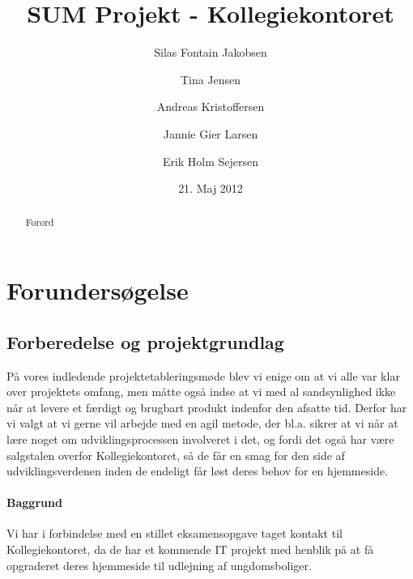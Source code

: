 \documentclass[12pt, a4paper]{report}
\begin{document}
\usepackage[utf8]{inputenc}
\usepackage[T1]{fontenc}
\usepackage[danish]{babel}

\usepackage{setspace}
\onehalfspacing
\usepackage{fix-cm}
\usepackage[a4paper,margin=2.5cm,headheight=2cm]{geometry}
\usepackage{lastpage}
\usepackage{fancyhdr}
\pagestyle{fancy} %
\fancyhead[R]{\today}


\setcounter{secnumdepth}{-1}
\title{SUM Projekt - Kollegiekontoret}
\author{Silas Fontain Jakobsen \and Tina Jensen \and Andreas Kristoffersen \and Jannie Gier Larsen \and Erik Holm Sejersen}
\date{21. Maj 2012}


\begin{titlepage}
\maketitle
\end{titlepage}

\begin{abstract}
Forord
\end{abstract}

\tableofcontents

\chapter{Forundersøgelse}

\section{Forberedelse og projektgrundlag}
På vores indledende projektetableringsmøde blev vi enige om at vi alle var klar over projektets omfang, men måtte også indse at vi med al sandsynlighed ikke når at levere et færdigt og brugbart produkt indenfor den afsatte tid.
Derfor har vi valgt at vi gerne vil arbejde med en agil metode, der bl.a. sikrer at vi når at lære noget om udviklingsprocessen involveret i det, og fordi det også har være salgstalen overfor Kollegiekontoret, så de får en smag for den side af udviklingsverdenen inden de endeligt får løst deres behov for en hjemmeside.

\subsubsection{Baggrund}
Vi har i forbindelse med en stillet eksamensopgave taget kontakt til Kollegiekontoret, da de har et kommende IT projekt med henblik på at få opgraderet deres hjemmeside til udlejning af ungdomsboliger.
\end{document}
